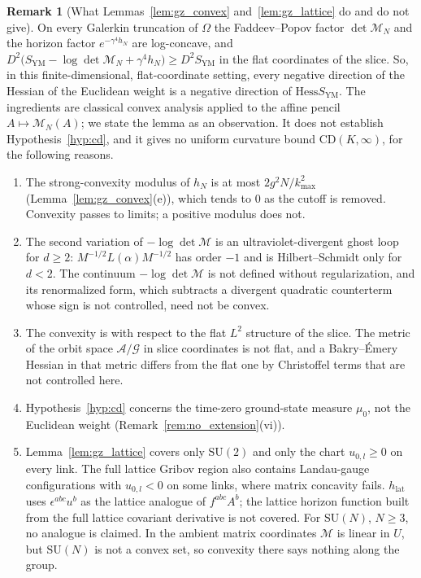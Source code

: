\documentclass[11pt,a4paper]{amsart}
\theoremstyle{definition}
\newtheorem{remark}[theorem]{Remark}
\newcommand{\cA}{\mathcal{A}}
\newcommand{\cG}{\mathcal{G}}
\newcommand{\Hess}{\mathrm{Hess}}
\begin{document}
\begin{remark}[What Lemmas~\ref{lem:gz_convex} and~\ref{lem:gz_lattice} do and do not give]
\label{rem:gz_convex_scope}
On every Galerkin truncation of $\Omega$ the Faddeev--Popov factor $\det\mathcal{M}_N$ and the horizon factor $e^{-\gamma^4h_N}$ are log-concave, and $D^2\big(S_{\mathrm{YM}} - \log\det\mathcal{M}_N + \gamma^4h_N\big) \ge D^2S_{\mathrm{YM}}$ in the flat coordinates of the slice. So, in this finite-dimensional, flat-coordinate setting, every negative direction of the Hessian of the Euclidean weight is a negative direction of $\Hess S_{\mathrm{YM}}$. The ingredients are classical convex analysis applied to the affine pencil $A \mapsto \mathcal{M}_N(A)$; we state the lemma as an observation. It does not establish Hypothesis~\ref{hyp:cd}, and it gives no uniform curvature bound $\mathrm{CD}(K,\infty)$, for the following reasons.
\begin{enumerate}[label=(\alph*)]
    \item The strong-convexity modulus of $h_N$ is at most $2g^2N/k_{\max}^2$ (Lemma~\ref{lem:gz_convex}(e)), which tends to $0$ as the cutoff is removed. Convexity passes to limits; a positive modulus does not.
    \item The second variation of $-\log\det\mathcal{M}$ is an ultraviolet-divergent ghost loop for $d \ge 2$: $M^{-1/2}L(\alpha)M^{-1/2}$ has order $-1$ and is Hilbert--Schmidt only for $d < 2$. The continuum $-\log\det\mathcal{M}$ is not defined without regularization, and its renormalized form, which subtracts a divergent quadratic counterterm whose sign is not controlled, need not be convex.
    \item The convexity is with respect to the flat $L^2$ structure of the slice. The metric of the orbit space $\cA/\cG$ in slice coordinates is not flat, and a Bakry--\'Emery Hessian in that metric differs from the flat one by Christoffel terms that are not controlled here.
    \item Hypothesis~\ref{hyp:cd} concerns the time-zero ground-state measure $\mu_0$, not the Euclidean weight (Remark~\ref{rem:no_extension}(vi)).
    \item Lemma~\ref{lem:gz_lattice} covers only $\mathrm{SU}(2)$ and only the chart $u_{0,l} \ge 0$ on every link. The full lattice Gribov region also contains Landau-gauge configurations with $u_{0,l} < 0$ on some links, where matrix concavity fails. $h_{\mathrm{lat}}$ uses $\epsilon^{abc}u^b$ as the lattice analogue of $f^{abc}A^b$; the lattice horizon function built from the full lattice covariant derivative is not covered. For $\mathrm{SU}(N)$, $N \ge 3$, no analogue is claimed. In the ambient matrix coordinates $\mathcal{M}$ is linear in $U$, but $\mathrm{SU}(N)$ is not a convex set, so convexity there says nothing along the group.
\end{enumerate}
\end{remark}
\end{document}
